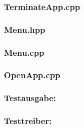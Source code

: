 \documentclass[a4paper,12pt]{article}
\begin{document}
\subsubsection{TerminateApp.cpp}

\newpage

\subsubsection{Menu.hpp}

\newpage

\subsubsection{Menu.cpp}

\newpage

\subsubsection{OpenApp.cpp}

\newpage

\subsubsection{Testausgabe:}

\newpage
\subsubsection{Testtreiber:}

\end{document}
